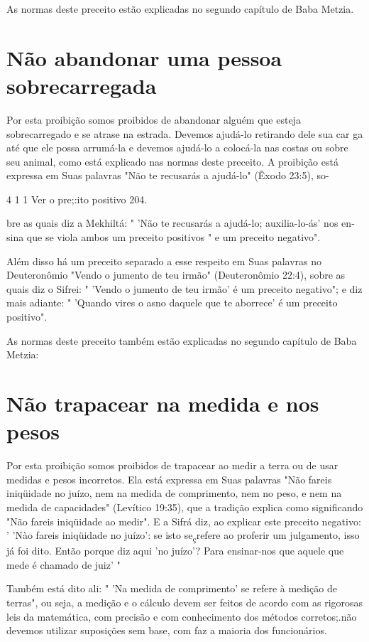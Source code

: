 \begin{itemize}
\begin{enumrate}
\begin{itemize}
\begin{itemize}
\begin{itemize}
As normas deste preceito estão explicadas no segundo capítulo de Baba
Metzia.

\section{Não abandonar uma pessoa sobrecarregada}

Por esta proibição somos proibidos de abandonar alguém que esteja
sobrecarregado e se atrase na estrada. Devemos ajudá-lo retirando dele
sua car ga até que ele possa arrumá-la e devemos ajudá-lo a colocá-la
nas costas ou so­bre seu animal, como está explicado nas normas deste
preceito. A proibição está expressa em Suas palavras "Não te recusarás a
ajudá-lo" (Êxodo 23:5), so-

4 1 1 Ver o pre;:ito positivo 204.

bre as quais diz a Mekhiltá: " 'Não te recusarás a ajudá-lo;
auxilia-lo-ás' nos en­sina que se viola ambos um preceito positivos " e
um preceito negativo".

Além disso há um preceito separado a esse respeito em Suas pala­vras no
Deuteronômio "Vendo o jumento de teu irmão" (Deuteronômio 22:4), sobre
as quais diz o Sifrei: " 'Vendo o jumento de teu irmão' é um preceito
negativo"; e diz mais adiante: " 'Quando vires o asno daquele que te
aborrece' é um preceito positivo".

As normas deste preceito também estão explicadas no segundo ca­pítulo de
Baba Metzia:

\section{Não trapacear na medida e nos pesos}

Por esta proibição somos proibidos de trapacear ao medir a terra ou de
usar medidas e pesos incorretos. Ela está expressa em Suas palavras "Não
fareis iniqüidade no juízo, nem na medida de comprimento, nem no peso, e
nem na medida de capacidades" (Levítico 19:35), que a tradição explica
como significando "Não fareis iniqüidade ao medir". E a Sifrá diz, ao
explicar este preceito negativo: ' 'Nào fareis iniqüidade no juízo': se
isto se\textsubscript{ç}refere ao profe­rir um julgamento, isso já foi
dito. Então porque diz aqui 'no juízo'? Para ensinar-nos que aquele que
mede é chamado de juiz' "

Também está dito ali: " 'Na medida de comprimento' se refere à me­dição
de terras", ou seja, a medição e o cálculo devem ser feitos de acordo
com as rigorosas leis da matemática, com precisão e com conhecimento dos
méto­dos corretos;.não devemos utilizar suposições sem base, com faz a
maioria dos funcionários.


\end{itemize}
\end{itemize}
\end{itemize}
\end{enumrate}
\end{itemize}
